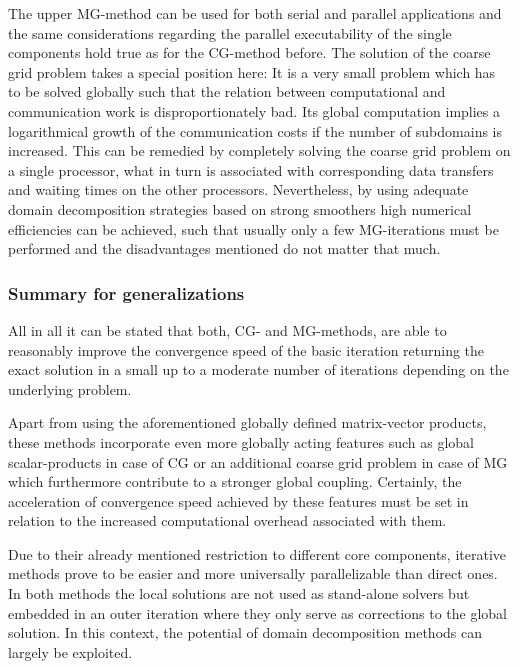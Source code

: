 \newpage
The upper MG-method can be used for both serial and parallel applications and the same considerations regarding the parallel executability of the single components hold true as for the CG-method before.
%
The solution of the coarse grid problem takes a special position here: It is a very small problem which has to be solved globally such that the relation between computational and communication work is disproportionately bad.
Its global computation implies a logarithmical growth of the communication costs if the number of subdomains is increased. This can be remedied by completely solving the coarse grid problem on a single processor, what in turn is associated with corresponding data transfers and waiting times on the other processors. Nevertheless, by using adequate domain decomposition strategies based on strong smoothers high numerical efficiencies can be achieved, such that usually only a few MG-iterations must be performed and the disadvantages mentioned do not matter that much.


\subsubsection{Summary for generalizations}  
All in all it can be stated that both, CG- and MG-methods, are able to reasonably improve the convergence speed of the basic iteration returning the exact solution in a small up to a moderate number of iterations depending on the underlying problem. 

Apart from using the aforementioned globally defined matrix-vector products, these methods incorporate even more globally acting features such as global scalar-products in case of CG or an additional coarse grid problem in case of MG which furthermore contribute to a stronger global coupling. Certainly, the acceleration of convergence speed achieved by these features must be set in relation to the increased computational overhead associated with them.

Due to their already mentioned restriction to different core components, iterative methods prove to be easier and more universally parallelizable than direct ones. In both methods the local solutions are not used as stand-alone solvers but embedded in an outer iteration where they only serve as corrections to the global solution. In this context, the potential of domain decomposition methods can largely be exploited.



